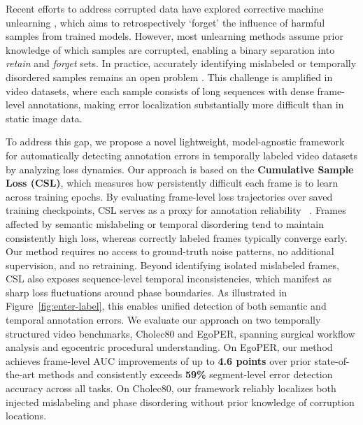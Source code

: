 \documentclass{article}
\theoremstyle{plain}
\theoremstyle{definition}
\theoremstyle{remark}
\begin{document}
Recent efforts to address corrupted data have explored corrective machine unlearning \cite{goel2024corrective}, which aims to retrospectively `forget' the influence of harmful samples from trained models. However, most unlearning methods assume prior knowledge of which samples are corrupted, enabling a binary separation into \textit{retain} and \textit{forget} sets. In practice, accurately identifying mislabeled or temporally disordered samples remains an open problem \cite{garg2023memorization}. This challenge is amplified in video datasets, where each sample consists of long sequences with dense frame-level annotations, making error localization substantially more difficult than in static image data.

To address this gap, we propose a novel lightweight, model-agnostic framework for automatically detecting annotation errors in temporally labeled video datasets by analyzing loss dynamics. Our approach is based on the \textbf{Cumulative Sample Loss (CSL)}, which measures how persistently difficult each frame is to learn across training epochs. By evaluating frame-level loss trajectories over saved training checkpoints, CSL serves as a proxy for annotation reliability ~\cite{dataset_cartography, deepak_angularloss, loss_importance}. Frames affected by semantic mislabeling or temporal disordering tend to maintain consistently high loss, whereas correctly labeled frames typically converge early.
Our method requires no access to ground-truth noise patterns, no additional supervision, and no retraining. Beyond identifying isolated mislabeled frames, CSL also exposes sequence-level temporal inconsistencies, which manifest as sharp loss fluctuations around phase boundaries. As illustrated in Figure~\ref{fig:enter-label}, this enables unified detection of both semantic and temporal annotation errors.
We evaluate our approach on two temporally structured video benchmarks, Cholec80 and EgoPER, spanning surgical workflow analysis and egocentric procedural understanding. On EgoPER, our method achieves frame-level AUC improvements of up to \textbf{4.6 points} over prior state-of-the-art methods and consistently exceeds \textbf{59\%} segment-level error detection accuracy across all tasks. On Cholec80, our framework reliably localizes both injected mislabeling and phase disordering without prior knowledge of corruption locations.
\end{document}

